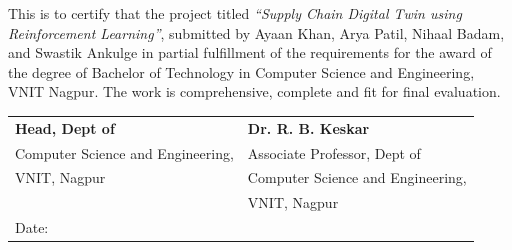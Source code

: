\noindent This is to certify that the project titled \textit{``Supply Chain Digital Twin using Reinforcement Learning''}, submitted by Ayaan Khan, Arya Patil, Nihaal Badam, and Swastik Ankulge in partial fulfillment of the requirements for the award of the degree of Bachelor of Technology in Computer Science and Engineering, VNIT Nagpur. The work is comprehensive, complete and fit for final evaluation.

\vspace{2.5cm}

\begin{tabular}{p{6cm} p{6cm}}
    \textbf{Head, Dept of}                                          &  \textbf{Dr. R. B. Keskar}           \\
    Computer Science and Engineering,                               &  Associate Professor, Dept of         \\
    VNIT, Nagpur                                                    &  Computer Science and Engineering,    \\
                                                                    &  VNIT, Nagpur                         \\[1cm]
    Date:                                                           &                                       \\
\end{tabular}
